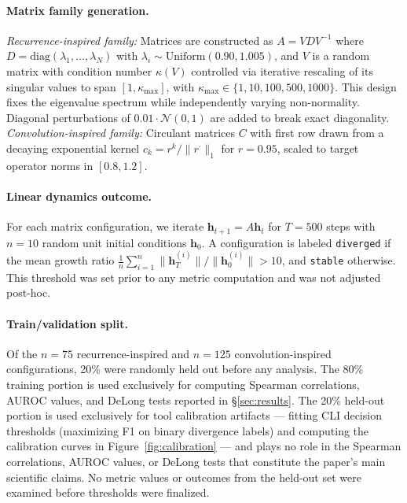 \documentclass[twoside]{article}
\begin{document}
\paragraph{Matrix family generation.}
\textit{Recurrence-inspired family:} Matrices are constructed as $A = V D V^{-1}$ where $D = \mathrm{diag}(\lambda_1, \ldots, \lambda_N)$ with $\lambda_i \sim \mathrm{Uniform}(0.90, 1.005)$, and $V$ is a random matrix with condition number $\kappa(V)$ controlled via iterative rescaling of its singular values to span $[1, \kappa_{\max}]$, with $\kappa_{\max} \in \{1, 10, 100, 500, 1000\}$. This design fixes the eigenvalue spectrum while independently varying non-normality. Diagonal perturbations of $0.01 \cdot \mathcal{N}(0,1)$ are added to break exact diagonality.
\textit{Convolution-inspired family:} Circulant matrices $C$ with first row drawn from a decaying exponential kernel $c_k = r^k / \|r^{\cdot}\|_1$ for $r = 0.95$, scaled to target operator norms in $[0.8, 1.2]$.

\paragraph{Linear dynamics outcome.}
For each matrix configuration, we iterate $\mathbf{h}_{t+1} = A \mathbf{h}_t$ for $T = 500$ steps with $n = 10$ random unit initial conditions $\mathbf{h}_0$. A configuration is labeled \texttt{diverged} if the mean growth ratio $\frac{1}{n}\sum_{i=1}^n \|\mathbf{h}_T^{(i)}\| / \|\mathbf{h}_0^{(i)}\| > 10$, and \texttt{stable} otherwise. This threshold was set prior to any metric computation and was not adjusted post-hoc.

\paragraph{Train/validation split.}
Of the $n=75$ recurrence-inspired and $n=125$ convolution-inspired configurations, 20\% were randomly held out before any analysis. The 80\% training portion is used exclusively for computing Spearman correlations, AUROC values, and DeLong tests reported in \S\ref{sec:results}. The 20\% held-out portion is used exclusively for tool calibration artifacts — fitting CLI decision thresholds (maximizing F1 on binary divergence labels) and computing the calibration curves in Figure~\ref{fig:calibration} — and plays no role in the Spearman correlations, AUROC values, or DeLong tests that constitute the paper's main scientific claims. No metric values or outcomes from the held-out set were examined before thresholds were finalized.
\end{document}
